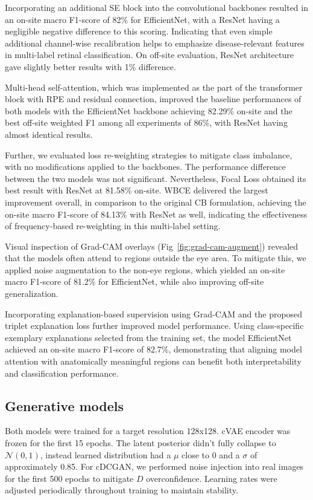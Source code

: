 \documentclass{article}
\begin{document}
Incorporating an additional SE block into the convolutional backbones resulted in an on-site macro F1-score of 82\% for EfficientNet, with a ResNet having a negligible negative difference to this scoring. Indicating that even simple additional channel-wise recalibration helps to emphasize disease-relevant features in multi-label retinal classification. On off-site evaluation, ResNet architecture gave slightly better results with 1\% difference.

Multi-head self-attention, which was implemented as the part of the transformer block with RPE and residual connection, improved the baseline performances of both models with the EfficientNet backbone achieving 82.29\% on-site and the best off-site weighted F1 among all experiments of 86\%, with ResNet having almost identical results.

Further, we evaluated loss re-weighting strategies to mitigate class imbalance, with no modifications applied to the backbones. The performance difference between the two models was not significant. Nevertheless, Focal Loss obtained its best result with ResNet at 81.58\% on-site. WBCE delivered the largest improvement overall, in comparison to the original CB formulation, achieving the on-site macro F1-score of 84.13\% with ResNet as well, indicating the effectiveness of frequency-based re-weighting in this multi-label setting.

Visual inspection of Grad-CAM overlays (Fig~\ref{fig:grad-cam-augment}) revealed that the models often attend to regions outside the eye area. To mitigate this, we applied noise augmentation to the non-eye regions, which yielded an on-site macro F1-score of 81.2\%  for EfficientNet, while also improving off-site generalization.

Incorporating explanation-based supervision using Grad-CAM and the proposed triplet explanation loss further improved model performance. Using class-specific exemplary explanations selected from the training set, the model EfficientNet achieved an on-site macro F1-score of 82.7\%, demonstrating that aligning model attention with anatomically meaningful regions can benefit both interpretability and classification performance.


\subsection{Generative models}
Both models were trained for a target resolution 128x128. cVAE encoder was frozen for the first 15 epochs. The latent posterior didn't fully collapse to $\mathcal{N}(0,1)$, instead learned distribution had a $\mu$ close to 0 and a $\sigma$ of approximately 0.85. For cDCGAN, we performed noise injection into real images for the first 500 epochs to mitigate $D$ overconfidence. Learning rates were adjusted periodically throughout training to maintain stability.
\end{document}

